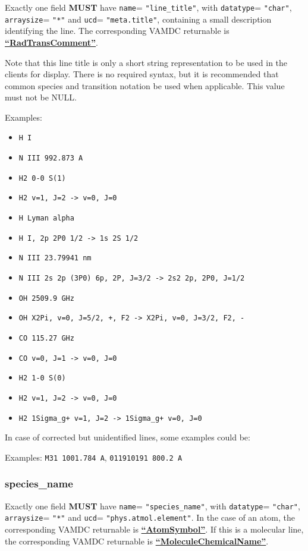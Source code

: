 \documentclass[11pt,a4paper]{ivoa}
\def\attrval#1#2{\texttt{#1}\discretionary{}{}{}=\discretionary{}{}{}%
  \texttt{"#2"}}
\def\vamdcret#1{\href{https://dictionary.vamdc.eu/returnables/\##1}{\textbf{``\color{vamdccolor}#1''}}}
\begin{document}
Exactly one field \textbf{MUST} have \attrval{name}{line\_title}, with
\attrval{datatype}{char}, \attrval{arraysize}{*} and \attrval{ucd}{meta.title}, containing a small description identifying the line.
The corresponding VAMDC returnable is \vamdcret{RadTransComment}.

Note that this line title is only a short string representation to be
used in the clients for display. There is no required syntax, but it is
recommended that common species and transition notation be used when
applicable. This value must not be NULL.

Examples:
\begin{itemize}[label={\small$\bullet$}, itemsep=0pt, parsep=0pt]
  \item \verb|H I|
  \item \verb|N III 992.873 A|
  \item \verb|H2 0-0 S(1)|
  \item \verb|H2 v=1, J=2 -> v=0, J=0|
  \item \verb|H Lyman alpha|
  \item \verb|H I, 2p 2P0 1/2 -> 1s 2S 1/2|
  \item \verb|N III 23.79941 nm|
  \item \verb|N III 2s 2p (3P0) 6p, 2P, J=3/2 -> 2s2 2p, 2P0, J=1/2|
  \item \verb|OH 2509.9 GHz|
  \item \verb|OH X2Pi, v=0, J=5/2, +, F2 -> X2Pi, v=0, J=3/2, F2, -|
  \item \verb|CO 115.27 GHz|
  \item \verb|CO v=0, J=1 -> v=0, J=0|
  \item \verb|H2 1-0 S(0)|
  \item \verb|H2 v=1, J=2 -> v=0, J=0|
  \item \verb|H2 1Sigma_g+ v=1, J=2 -> 1Sigma_g+ v=0, J=0|
\end{itemize}

In case of corrected but unidentified lines, some examples could be:

Examples: \verb|M31 1001.784 A|, \verb|011910191 800.2 A|

\subsubsection{species\_name}

Exactly one field \textbf{MUST} have
\attrval{name}{species\_name}, with  \attrval{datatype}{char}, \attrval{arraysize}{*} and
\attrval{ucd}{phys.atmol.element}.
In the case of an atom, the corresponding VAMDC returnable is \vamdcret{AtomSymbol}.
If this is a molecular line, the corresponding VAMDC returnable is \vamdcret{MoleculeChemicalName}.
\end{document}
